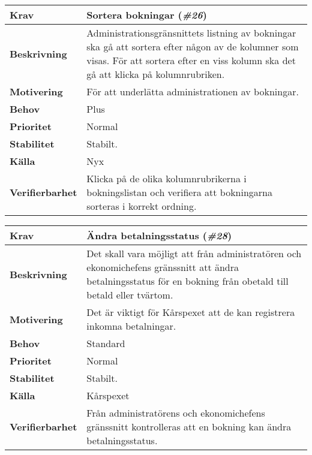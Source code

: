 \documentclass[a4paper, twoside, 11pt, titlepage]{article}
\begin{document}
	\begin{tabular} { p{2.6cm} p{12.5cm} }
		\hline
		\sffamily\textbf{Krav} & Sortera bokningar (\emph{\#26})  \\
		\hline
		\sffamily\textbf{Beskrivning} & Administrationsgränsnittets listning av bokningar ska gå att sortera efter någon av de kolumner som visas. För att sortera efter en viss kolumn ska det gå att klicka på kolumnrubriken.  \\
		\hline
		\sffamily\textbf{Motivering} & För att underlätta administrationen av bokningar.  \\
		\hline
		\sffamily\textbf{Behov} & Plus  \\
		\hline
		\sffamily\textbf{Prioritet} & Normal  \\
		\hline
		\sffamily\textbf{Stabilitet} & Stabilt.  \\
		\hline
		\sffamily\textbf{Källa} & Nyx  \\
		\hline
		\sffamily\textbf{Verifierbarhet} & Klicka på de olika kolumnrubrikerna i bokningslistan och verifiera att bokningarna sorteras i korrekt ordning.  \\
		\hline
	\end{tabular}
	\vspace{6mm}

	\begin{tabular} { p{2.6cm} p{12.5cm} }
		\hline
		\sffamily\textbf{Krav} & Ändra betalningsstatus (\emph{\#28})  \\
		\hline
		\sffamily\textbf{Beskrivning} & Det skall vara möjligt att från administratören och ekonomichefens gränssnitt att ändra betalningsstatus för en bokning från obetald till betald eller tvärtom.  \\
		\hline
		\sffamily\textbf{Motivering} & Det är viktigt för Kårspexet att de kan registrera inkomna betalningar.  \\
		\hline
		\sffamily\textbf{Behov} & Standard  \\
		\hline
		\sffamily\textbf{Prioritet} & Normal  \\
		\hline
		\sffamily\textbf{Stabilitet} & Stabilt.  \\
		\hline
		\sffamily\textbf{Källa} & Kårspexet  \\
		\hline
		\sffamily\textbf{Verifierbarhet} & Från administratörens och ekonomichefens gränssnitt kontrolleras att en bokning kan ändra betalningsstatus.  \\
		\hline
	\end{tabular}
	\vspace{6mm}
\end{document}
